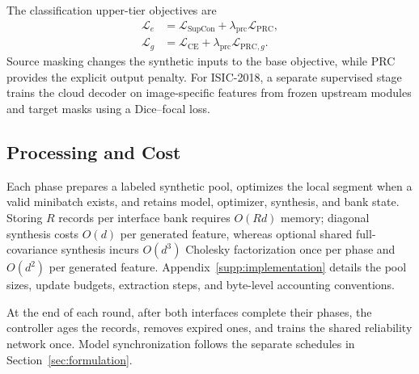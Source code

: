 The classification upper-tier objectives are
\begin{align}
 \mathcal L_e&=\mathcal L_{\mathrm{SupCon}}
 +\lambda_{\mathrm{prc}}\mathcal L_{\mathrm{PRC}},
 \label{eq:edge_loss}\\
 \mathcal L_g&=\mathcal L_{\mathrm{CE}}
 +\lambda_{\mathrm{prc}}\mathcal L_{\mathrm{PRC},g}.
 \label{eq:cloud_loss}
\end{align}
Source masking changes the synthetic inputs to the base objective, while PRC provides the explicit output penalty. For ISIC-2018, a separate supervised stage trains the cloud decoder on image-specific features from frozen upstream modules and target masks using a Dice--focal loss.

\subsection{Processing and Cost}
\label{sec:processing_cost}
Each phase prepares a labeled synthetic pool, optimizes the local segment when a valid minibatch exists, and retains model, optimizer, synthesis, and bank state. Storing $R$ records per interface bank requires $O(Rd)$ memory; diagonal synthesis costs $O(d)$ per generated feature, whereas optional shared full-covariance synthesis incurs $O(d^3)$ Cholesky factorization once per phase and $O(d^2)$ per generated feature. Appendix~\ref{supp:implementation} details the pool sizes, update budgets, extraction steps, and byte-level accounting conventions.

At the end of each round, after both interfaces complete their phases, the controller ages the records, removes expired ones, and trains the shared reliability network once. Model synchronization follows the separate schedules in Section~\ref{sec:formulation}.